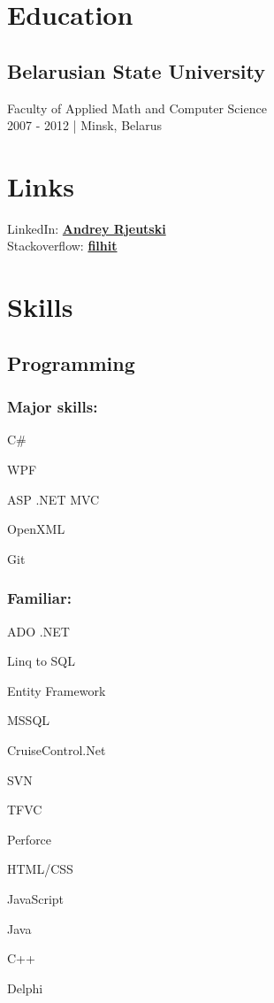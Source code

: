 \documentclass[a4paper]{article}
\newcommand{\periodandlocation}[1]{{\small #1}}
\begin{document}
  \vspace{1cm}
  \begin{minipage}[t]{0.34\textwidth}
    \section*{Education} 
    \subsection*{Belarusian State University}
    Faculty of Applied Math and Computer Science\\
	\periodandlocation{2007 - 2012 | Minsk, Belarus}
    \section*{Links} 
    LinkedIn: \href{https://linkedin.com/in/andrey-rjeutski-92064741}{\bf Andrey Rjeutski} \\
    Stackoverflow: \href{http://stackoverflow.com/users/3506292/filhit}{\bf filhit}
    \section*{Skills}
    \subsection*{Programming}
    \subsubsection*{Major skills:}
	\begin{inparaitem}
      \item C\# 
	  \item WPF
	  \item ASP .NET MVC
	  \item OpenXML
	  \item Git
	\end{inparaitem}
    \subsubsection*{Familiar:}
	\begin{inparaitem}
      \item ADO .NET 
	  \item Linq to SQL
	  \item Entity Framework
	  \item MSSQL
	  \item CruiseControl.Net
	  \item SVN
	  \item TFVC
	  \item Perforce
	  \item HTML/CSS
	  \item JavaScript
	  \item Java
	  \item C++
	  \item Delphi
	\end{inparaitem}

\end{minipage}
\end{document}
